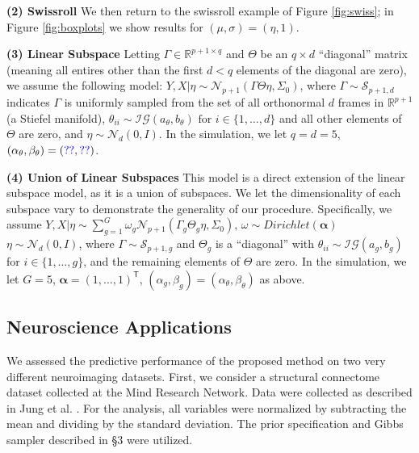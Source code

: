 \documentclass{article} %
\newcommand{\Real}{\mathbb{R}}
\providecommand{\mb}[1]{\boldsymbol{#1}}
\providecommand{\mc}[1]{\mathcal{#1}}
\newcommand{\T}{^{\ensuremath{\mathsf{T}}}}           %
\newcommand{\dd}[1]{{\color{blue}{\it #1}}}
\begin{document}
\textbf{(2) Swissroll} 
% 
We then return to the swissroll example of Figure \ref{fig:swiss}; in Figure \ref{fig:boxplots} we show results for $(\mu,\sigma)=(\eta,1)$. %

\textbf{(3) Linear Subspace} Letting $\Gamma \in \Real^{p+1 \times q}$ and $\Theta$ be an ${q \times d}$ ``diagonal'' matrix (meaning all entires other than the first $d < q$ elements of the diagonal are zero), we assume the following model:
	$Y,X |\eta \sim \mc{N}_{p+1}(\Gamma \Theta \eta ,\Sigma_0)$,
	where 	$\Gamma \sim \mc{S}_{p+1,d}$ indicates $\Gamma$ is uniformly sampled from the set of all orthonormal $d$ frames in $\Real^{p+1}$ (a Stiefel manifold), 
	$\theta_{ii} \sim \mc{IG}(a_\theta,b_\theta) \text{ for } i \in \{1, \ldots, d\}$ and all other elements of $\Theta$ are zero, and $\eta  \sim \mc{N}_d(0, I)$.  In the simulation, we let $q=d=5$,   $(\alpha_\theta,\beta_\theta)=(\dd{??},\dd{??})$. %


\textbf{(4) Union of Linear Subspaces}
This model is a direct extension of the linear subspace model, as it is a union of subspaces. We let the dimensionality of each subspace vary to demonstrate the generality of our procedure.  Specifically, we assume 	$Y,X |\eta \sim \sum_{g=1}^G \omega_g \mc{N}_{p+1}(\Gamma_g \Theta_g \eta ,\Sigma_0)$, $\omega \sim Dirichlet(\mb{\alpha})$ 
	$\eta \sim \mc{N}_d(0, I)$, 
where $\Gamma \sim \mc{S}_{p+1,g}$ and $\Theta_g$ is a ``diagonal'' with $\theta_{ii} \sim \mc{IG}(a_g,b_g)$ for  $i \in \{1, \ldots, g\}$, and the remaining elements of $\Theta$ are zero.
In the simulation, we let $G=5$,  $\mb{\alpha}=(1, \ldots, 1)\T$,  $(\alpha_g,\beta_g)=(\alpha_\theta,\beta_\theta)$ as above. %
  



\subsection{Neuroscience Applications}

We assessed the predictive performance of the proposed method on two very different neuroimaging datasets. First, we consider a structural connectome dataset collected at the Mind Research Network.  Data were collected as described in Jung et al. \cite{Jung2010}. For the analysis, all variables were normalized by subtracting the mean and dividing by the standard deviation. The  prior specification and Gibbs sampler described in \S 3 were utilized. 
\end{document}
